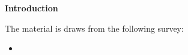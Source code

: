 \begin{frame}\begin{center}
	\LARGE\textbf{Introduction}
\end{center}\end{frame}
\begin{frame}

The material is draws from the following survey:

\begin{itemize}
\item {}
\end{itemize}

\end{frame}
